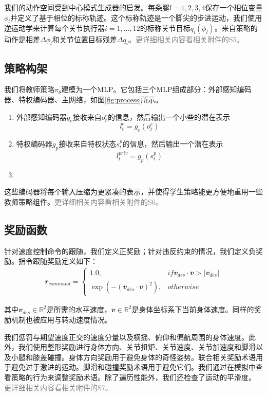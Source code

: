 我们的动作空间受到中心模式生成器的启发\cite[p]{Lee_Hwangbo_Wellhausen_Koltun_Hutter_2020}。每条腿$l={1,2,3,4}$保存一个相位变量$\phi_l$并定义了基于相位的标称轨迹。这个标称轨迹是一个脚尖的步进运动，我们使用逆运动学来计算每个关节执行器$i={1, \dots, 12}$的标称关节目标$q_i(\phi_l)$。来自策略的动作是相差$\Delta \phi_l$和关节位置目标残差$\Delta q_i$。\textcolor{gray}{\small 更详细相关内容看相关附件的S5。}

\subsection[策略构架]{策略构架}

我们将教师策略$\pi_{\theta}$建模为一个MLP。它包括三个MLP组成部分：外部感知编码器、特权编码器、主网络，如图\ref{fig:process}所示。
\begin{enumerate}
  \item 外部感知编码器$g_e$接收来自$o_t^e$的信息，然后输出一个小些的潜在表示$$l_t^e=g_e(o_t^e)$$
  \item 特权编码器$g_p$接收来自特权状态$s_t^p$的信息，然后输出一个潜在表示$$l_t^{priv}=g_p(s_t^p)$$
  \item 
\end{enumerate}

这些编码器将每个输入压缩为更紧凑的表示，并使得学生策略能更方便地重用一些教师策略组件。\textcolor{gray}{\small 更详细相关内容看相关附件的S6。}

\subsection[奖励函数]{奖励函数}

针对速度控制命令的跟随，我们定义正奖励；针对违反约束的情况，我们定义负奖励。指令跟随奖励定义如下：
\begin{align}
  \mathbfit{r}_{command}=\begin{cases}
    1.0, &if \mathbfit{v}_{des}\cdot\mathbfit{v}>|\mathbfit{v}_{des}|\\
    \exp(-(\mathbfit{v}_{des}\cdot\mathbfit{v})^2), &otherwise
  \end{cases}
\end{align}

其中$\mathbfit{v}_{des}\in\mathbb{R}^2$是所需的水平速度，$\mathbfit{v}\in\mathbb{R}^2$是身体坐标系下当前身体速度。同样的奖励机制也被应用与转动速度情况。

我们惩罚与期望速度正交的速度分量以及横摇、俯仰和偏航周围的身体速度。此外，我们使用整形奖励进行身体方向、关节扭矩、关节速度、关节加速度和脚滑以及小腿和膝盖碰撞。身体方向奖励用于避免身体的奇怪姿势。联合相关奖励术语用于避免过于激进的运动。脚滑和碰撞奖励术语用于避免它们。我们通过在模拟中查看策略的行为来调整奖励术语。除了遍历性能外，我们还检查了运动的平滑度。
\textcolor{gray}{\small 更详细相关内容看相关附件的S7。}


